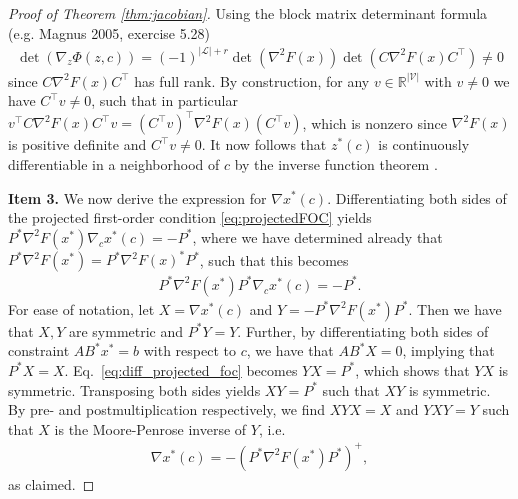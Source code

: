 \documentclass[a4paper,11pt]{article}
\newcommand{\R}{\mathbb{R}}
\begin{document}
\begin{proof}[Proof of Theorem \ref{thm:jacobian}]

Using the block matrix determinant formula (e.g. Magnus 2005, exercise 5.28)
\begin{eqnarray}
    \det\left(\nabla_z \Phi(z,c)\right)= (-1)^{|\mathcal{L}|+r}\det(\nabla^2 F(x) )\det\left(C \nabla^2 F(x)C^\top\right)\neq 0
\end{eqnarray}
since $C \nabla^2 F(x) C^\top$ has full rank. By construction, for any $v\in \mathbb R^{|\mathcal{V}|}$ with $v\neq 0$ we have $C^\top v\neq 0$, such that in particular $v^\top C\nabla^2F (x) C^\top v = (C^\top v)^\top \nabla^2 F(x) (C^\top v)$, which is nonzero since $\nabla^2 F(x)$ is positive definite and $C^\top v\neq 0$. It now follows that $z^*(c)$ is continuously differentiable in a neighborhood of $c$ by the inverse function theorem \citep[][Theorem 3.3.2]{krantz_implicit_2003}.


\textbf{Item 3.} We now derive the expression for $\nabla x^*(c)$. Differentiating both sides of the projected first-order condition \eqref{eq:projectedFOC} yields $P^* \nabla^2 F(x^*) \nabla_c x^*(c)=- P^*$,
where we have determined already that $P^*\nabla^2 F(x^*)=P^*\nabla^2 F(x)^*P^*$, such that this becomes
\begin{eqnarray}\label{eq:diff_projected_foc}
   P^* \nabla^2 F(x^*)P^* \nabla_c x^*(c)=- P^*.
\end{eqnarray}
For ease of notation, let $X=\nabla x^*(c)$ and $Y=-P^*\nabla^2 F(x^*)P^*$. Then we have that $X,Y$ are symmetric and $P^*Y=Y$. Further, by differentiating both sides of constraint $A B^* x^* = b$ with respect to $c$, we have that $A B^* X = 0$, implying that $P^* X = X$. Eq.~\eqref{eq:diff_projected_foc} becomes $YX=P^*$, which shows that $YX$ is symmetric. Transposing both sides yields $XY=P^*$ such that $XY$ is symmetric. By pre- and postmultiplication respectively, we find  $XYX=X$ and $YXY=Y$ such that $X$ is the Moore-Penrose inverse of $Y$, i.e.
\begin{eqnarray}\label{eq:derivative}
    \nabla x^*(c)=-\left( P^*\nabla^2 F(x^*)P^*\right)^+,
\end{eqnarray}
as claimed.


\end{proof}
\end{document}
